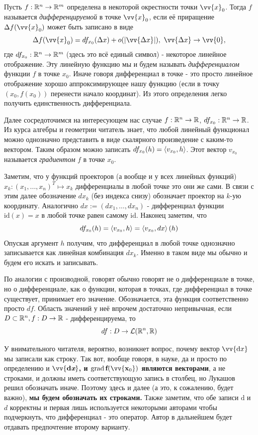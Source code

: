\begin{adefinition}
	Пусть $f: \mathbb{R}^n\to\mathbb{R}^m$ определена в некоторой окрестности точки $\vv{x}_0$. Тогда $f$ называется \textit{дифференцируемой} в точке $\vv{x}_0$, если её приращение $\Delta f(\vv{x}_0)$ может быть записано в виде
	\[
	\Delta f(\vv{x}_0) = df_{x_0}(\Delta x) + o(|\vv{\Delta x}|),\ \vv{\Delta x} \to \vv{0},
	\]
	где $df_{x_0}: \mathbb{R}^n\to\mathbb{R}^m$ (здесь это всё единый символ) - некоторое линейное отображение. Эту линейную  функцию мы и будем называть \textit{дифференциалом} функции $f$ в точке $x_0$. Иначе говоря дифференциал в точке - это просто линейное отображение хорошо аппроксимирующее нашу функцию (если в точку $(x_0, f(x_0))$ перенести начало координат). Из этого определения легко получить единственность дифференциала.
	
	Далее сосредоточимся на интересующем нас случае $f: \mathbb{R}^n\to\mathbb{R}$, $df_{x_0}:\mathbb{R}^n\to\mathbb{R}$.	Из курса алгебры и геометрии читатель знает, что любой линейный функционал можно однозначно представить в виде скалярного произведение с каким-то вектором. Таким образом можно записать $df_{x_0}(h) = \left\langle v_{x_0}, h\right\rangle$. Этот вектор $v_{x_0}$ называется \textit{градиентом} $f$ в точке $x_0$. 
	
	Заметим, что у функций проекторов (а вообще и у всех линейных функций) $x_k : (x_1, ..., x_n)^T\mapsto x_k$ дифференциалы в любой точке это они же сами. В связи с этим далее обозначение $dx_k$ (без индекса снизу) обозначает проектор на $k$-ую координату. Аналогично $dx := (dx_1,\dots, dx_n)$ - дифференциал функции $\mathrm{id}(x) = x$ в любой точке равен самому $\mathrm{id}$. Наконец заметим, что 
	\[
		df_{x_0}(h) = \left\langle v_{x_0}, h\right\rangle = \left\langle v_{x_0}, dx\right\rangle(h)
	\]
	Опуская аргумент $h$ получим, что дифференциал в любой точке однозначно записывается как линейная комбинация $dx_k$. Именно в таком виде мы обычно и будем его искать и записывать.
	
	По аналогии с производной, говорят обычно говорят не о дифференциале в точке, но о дифференциале, как о функции, которая в точках, где дифференциал в точке существует, принимает его значение. Обозначается, эта функция соответственно просто $df$. Область значений у неё впрочем достаточно непривычная, если $D\subset \mathbb{R}^n, f:D\to\mathbb{R}$ - дифференцируема, то 
	\[
		df:D\to\mathcal{L}(\mathbb{R}^n, \mathbb{R})
	\]
\end{adefinition}

\begin{anote}
	У внимательного читателя, вероятно, возникнет вопрос, почему вектор $\vv{\mathrm{d}x}$ мы записали как строку. Так вот, вообще говоря, в науке, да и просто по определению и \textbf{ $\vv{\mathrm{\textbf{d}}\textit{\textbf{x}}}$, и $\grad \textbf{f}(\vv{\textbf{x}_0})$  являются векторами}, а не строками, и должны иметь соответствующую запись в столбец, но Лукашов решил обозначать иначе. Поэтому здесь и далее (а это, к сожалению, будет важно), \textbf{мы будем обозначать их строками.} Также заметим, что обе записи $\mathrm{d}$ и $d$ корректны и первая лишь используется некоторыми авторами чтобы подчеркнуть, что дифференциал - это оператор. Автор в дальнейшем будет отдавать предпочтение второму варианту. 
\end{anote}



